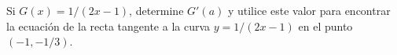 \item Si $G(x) = 1/(2x - 1)$, determine $G'(a)$ y utilice este valor para encontrar la ecuación de la recta tangente a la curva $y = 1/(2x - 1)$ en el punto $(-1,-1/3)$.
